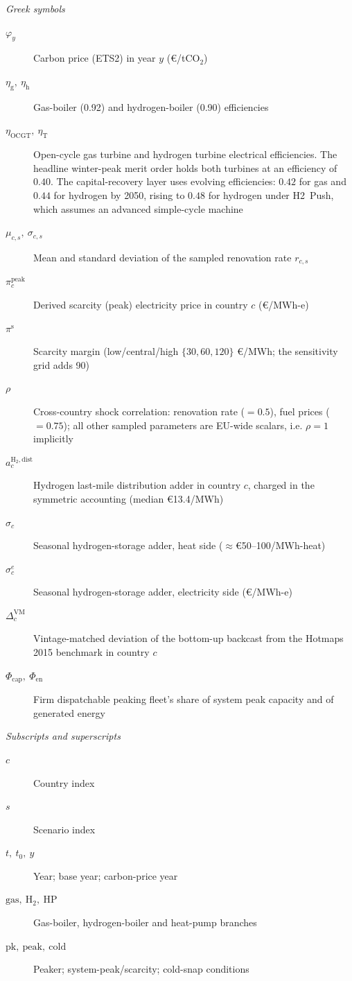 \documentclass[review]{elsarticle}
\begin{document}
\textit{Greek symbols}
\begin{description}
 \item[$\varphi_{y}$] Carbon price (ETS2) in year $y$ (\euro{}/tCO$_2$)
 \item[$\eta_{\mathrm{g}},\ \eta_{\mathrm{h}}$] Gas-boiler (0.92) and hydrogen-boiler (0.90) efficiencies
 \item[$\eta_{\mathrm{OCGT}},\ \eta_{\mathrm{T}}$] Open-cycle gas turbine and hydrogen turbine electrical efficiencies. The headline winter-peak merit order holds both turbines at an efficiency of $0.40$. The capital-recovery layer uses evolving efficiencies: $0.42$ for gas and $0.44$ for hydrogen by 2050, rising to $0.48$ for hydrogen under H2~Push, which assumes an advanced simple-cycle machine
 \item[$\mu_{c,s},\ \sigma_{c,s}$] Mean and standard deviation of the sampled renovation rate $r_{c,s}$
 \item[$\pi^{\mathrm{peak}}_{c}$] Derived scarcity (peak) electricity price in country $c$ (\euro{}/MWh-e)
 \item[$\pi^{\mathrm{s}}$] Scarcity margin (low/central/high $\{30,60,120\}$ \euro{}/MWh; the sensitivity grid adds 90)
 \item[$\rho$] Cross-country shock correlation: renovation rate ($=0.5$),
 fuel prices ($=0.75$); all other sampled parameters are EU-wide scalars, i.e.
 $\rho=1$ implicitly
 \item[$a^{\mathrm{H_2,dist}}_{c}$] Hydrogen last-mile distribution adder in country $c$, charged in the symmetric accounting (median \euro{}13.4/MWh)
 \item[$\sigma_{c}$] Seasonal hydrogen-storage adder, heat side ($\approx$\euro{}50--100/MWh-heat)
 \item[$\sigma^{e}_{c}$] Seasonal hydrogen-storage adder, electricity side (\euro{}/MWh-e)
 \item[$\Delta_{c}^{\mathrm{VM}}$] Vintage-matched deviation of the bottom-up backcast from the Hotmaps 2015 benchmark in country $c$
 \item[$\Phi_{\mathrm{cap}},\ \Phi_{\mathrm{en}}$] Firm dispatchable peaking fleet's share of system peak capacity and of generated energy
\end{description}

\textit{Subscripts and superscripts}
\begin{description}
 \item[$c$] Country index
 \item[$s$] Scenario index
 \item[$t,\ t_{0},\ y$] Year; base year; carbon-price year
 \item[$\mathrm{gas},\ \mathrm{H_2},\ \mathrm{HP}$] Gas-boiler, hydrogen-boiler and heat-pump branches
 \item[$\mathrm{pk},\ \mathrm{peak},\ \mathrm{cold}$] Peaker; system-peak/scarcity; cold-snap conditions
\end{description}
\end{document}
